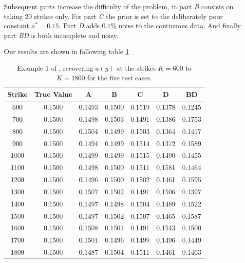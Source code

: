 Subsequent parts increase the difficulty of the problem,
in part \emph{B} consists on taking 20 strikes only.
For part \emph{C} the prior is set to the deliberately poor constant $a^* = 0.15$.
Part \emph{D} adds $0.1\%$ noise to the continuous data.
And finally part \emph{BD} is both incomplete and noisy.

Our results are shown in following table \ref{tab:example_1}
\begin{table}[h]
    \centering
    \begin{tabular}{c c c c c c c}
        \toprule
        Strike & True Value & A & B & C & D & BD \\
        \midrule
        600 & 0.1500 & 0.1493 & 0.1500 & 0.1519 & 0.1378 & 0.1245 \\
        700 & 0.1500 & 0.1498 & 0.1503 & 0.1491 & 0.1386 & 0.1753 \\
        800 & 0.1500 & 0.1504 & 0.1499 & 0.1503 & 0.1364 & 0.1417 \\
        900 & 0.1500 & 0.1494 & 0.1499 & 0.1514 & 0.1372 & 0.1589 \\
        1000 & 0.1500 & 0.1499 & 0.1499 & 0.1515 & 0.1490 & 0.1455 \\
        1100 & 0.1500 & 0.1498 & 0.1500 & 0.1511 & 0.1581 & 0.1464 \\
        1200 & 0.1500 & 0.1496 & 0.1500 & 0.1502 & 0.1461 & 0.1595 \\
        1300 & 0.1500 & 0.1507 & 0.1502 & 0.1491 & 0.1506 & 0.1397 \\
        1400 & 0.1500 & 0.1497 & 0.1498 & 0.1504 & 0.1489 & 0.1522 \\
        1500 & 0.1500 & 0.1497 & 0.1502 & 0.1507 & 0.1465 & 0.1587 \\
        1600 & 0.1500 & 0.1508 & 0.1501 & 0.1491 & 0.1543 & 0.1500 \\
        1700 & 0.1500 & 0.1501 & 0.1496 & 0.1499 & 0.1496 & 0.1449 \\
        1800 & 0.1500 & 0.1487 & 0.1504 & 0.1511 & 0.1461 & 0.1463 \\
        \bottomrule
    \end{tabular}
    \caption{
        Example 1 of \cite{egger2005tikhonov},
        recovering $a(y)$ at the strikes $K = 600$ to $K = 1800$ for the five test cases.
    }
    \label{tab:example_1}
\end{table}

